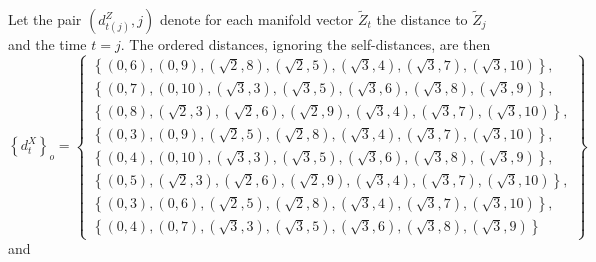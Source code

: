 \documentclass{article}[10pt]
\begin{document}
Let the pair $\left(d_{t(j)}^Z,j\right)$ denote for each manifold vector $\tilde{Z}_t$ the distance to $\tilde{Z}_j$ and the time $t=j$.  The ordered distances, ignoring the self-distances, are then
\begin{equation}
\left\{d_{t}^X\right\}_o = \left\{\begin{array}{c} 
\left\{\left(0,6\right),\left(0,9\right),\left(\sqrt{2},8\right),\left(\sqrt{2},5\right),\left(\sqrt{3},4\right),\left(\sqrt{3},7\right),\left(\sqrt{3},10\right)\right\},\\
\left\{\left(0,7\right),\left(0,10\right),\left(\sqrt{3},3\right),\left(\sqrt{3},5\right),\left(\sqrt{3},6\right),\left(\sqrt{3},8\right),\left(\sqrt{3},9\right)\right\},\\
\left\{\left(0,8\right),\left(\sqrt{2},3\right),\left(\sqrt{2},6\right),\left(\sqrt{2},9\right),\left(\sqrt{3},4\right),\left(\sqrt{3},7\right),\left(\sqrt{3},10\right)\right\},\\
\left\{\left(0,3\right),\left(0,9\right),\left(\sqrt{2},5\right),\left(\sqrt{2},8\right),\left(\sqrt{3},4\right),\left(\sqrt{3},7\right),\left(\sqrt{3},10\right)\right\},\\
\left\{\left(0,4\right),\left(0,10\right),\left(\sqrt{3},3\right),\left(\sqrt{3},5\right),\left(\sqrt{3},6\right),\left(\sqrt{3},8\right),\left(\sqrt{3},9\right)\right\},\\
\left\{\left(0,5\right),\left(\sqrt{2},3\right),\left(\sqrt{2},6\right),\left(\sqrt{2},9\right),\left(\sqrt{3},4\right),\left(\sqrt{3},7\right),\left(\sqrt{3},10\right)\right\},\\
\left\{\left(0,3\right),\left(0,6\right),\left(\sqrt{2},5\right),\left(\sqrt{2},8\right),\left(\sqrt{3},4\right),\left(\sqrt{3},7\right),\left(\sqrt{3},10\right)\right\},\\
\left\{\left(0,4\right),\left(0,7\right),\left(\sqrt{3},3\right),\left(\sqrt{3},5\right),\left(\sqrt{3},6\right),\left(\sqrt{3},8\right),\left(\sqrt{3},9\right)\right\}
\end{array}\right\}
\end{equation}
and
\end{document}
